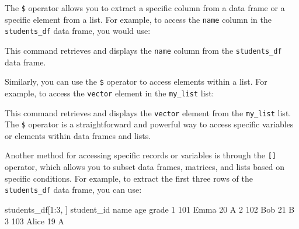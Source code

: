 \documentclass[
  11pt,
]{book}
\makeatletter
\newenvironment{Shaded}{}{}
\newcommand{\DecValTok}[1]{#1}
\newcommand{\NormalTok}[1]{#1}
\newcommand{\SpecialCharTok}[1]{\textcolor[rgb]{0.39,0.39,0.39}{#1}}
\newcommand{\StringTok}[1]{\textcolor[rgb]{0.39,0.39,0.39}{#1}}
\newenvironment{kframe}{%
\medskip{}
\setlength{\fboxsep}{.8em}
 \def\at@end@of@kframe{}%
 \ifinner\ifhmode%
  \def\at@end@of@kframe{\end{minipage}}%
  \begin{minipage}{\columnwidth}%
 \fi\fi%
 \def\FrameCommand##1{\hskip\@totalleftmargin \hskip-\fboxsep
 \colorbox{shadecolor}{##1}\hskip-\fboxsep
     \hskip-\linewidth \hskip-\@totalleftmargin \hskip\columnwidth}%
 \MakeFramed {\advance\hsize-\width
   \@totalleftmargin\z@ \linewidth\hsize
   \@setminipage}}%
 {\par\unskip\endMakeFramed%
 \at@end@of@kframe}
\renewenvironment{Shaded}{\begin{kframe}}{\end{kframe}}
\theoremstyle{definition}
\theoremstyle{definition}
\theoremstyle{definition}
\theoremstyle{definition}
\theoremstyle{remark}
\makeatother
\begin{document}
The \texttt{\$} operator allows you to extract a specific column from a data frame or a specific element from a list. For example, to access the \texttt{name} column in the \texttt{students\_df} data frame, you would use:

\begin{Shaded}
\end{Shaded}

This command retrieves and displays the \texttt{name} column from the \texttt{students\_df} data frame.

Similarly, you can use the \texttt{\$} operator to access elements within a list. For example, to access the \texttt{vector} element in the \texttt{my\_list} list:

\begin{Shaded}
\end{Shaded}

This command retrieves and displays the \texttt{vector} element from the \texttt{my\_list} list. The \texttt{\$} operator is a straightforward and powerful way to access specific variables or elements within data frames and lists.

Another method for accessing specific records or variables is through the \texttt{{[}{]}} operator, which allows you to subset data frames, matrices, and lists based on specific conditions. For example, to extract the first three rows of the \texttt{students\_df} data frame, you can use:

\begin{Shaded}
\begin{Highlighting}[]
\NormalTok{students\_df[}\DecValTok{1}\SpecialCharTok{:}\DecValTok{3}\NormalTok{, ]}
\NormalTok{     student\_id  name age grade}
   \DecValTok{1}        \DecValTok{101}\NormalTok{  Emma  }\DecValTok{20}\NormalTok{     A}
   \DecValTok{2}        \DecValTok{102}\NormalTok{   Bob  }\DecValTok{21}\NormalTok{     B}
   \DecValTok{3}        \DecValTok{103}\NormalTok{ Alice  }\DecValTok{19}\NormalTok{     A}
\end{Highlighting}
\end{Shaded}
\end{document}
